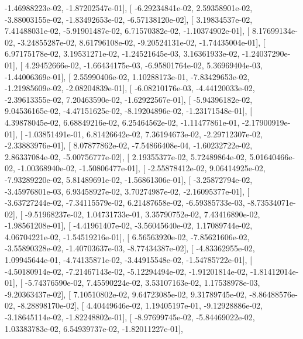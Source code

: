 \documentclass{article}
\begin{document}
         -1.46988223e-02,  -1.87202547e-01],
       [ -6.29234841e-02,   2.59358901e-02,  -3.88003155e-02,
         -1.83492653e-02,  -6.57138120e-02],
       [  3.19834537e-02,   7.41488031e-02,  -5.91901487e-02,
          6.71570382e-02,  -1.10374902e-01],
       [  8.17699134e-02,  -3.24855287e-02,   8.61796108e-02,
         -9.20524131e-02,  -1.74435004e-01],
       [  6.97175178e-02,   3.19531271e-02,  -1.24521645e-03,
          3.16361933e-02,  -1.24037290e-01],
       [  4.29452666e-02,  -1.66434175e-03,  -6.95801764e-02,
          5.36969404e-03,  -1.44006369e-01],
       [  2.55990406e-02,   1.10288173e-01,  -7.83429653e-02,
         -1.21985609e-02,  -2.08204839e-01],
       [ -6.08210176e-03,  -4.44120033e-02,  -2.39613355e-02,
          7.20463590e-02,  -1.62922567e-01],
       [ -5.94396182e-02,   9.04536165e-02,  -4.47151625e-02,
         -8.19204896e-02,  -1.23171548e-01],
       [  4.39878045e-02,   6.68849216e-02,   6.25464562e-02,
         -1.11477861e-01,  -2.17900919e-01],
       [ -1.03851491e-01,   6.81426642e-02,   7.36194673e-02,
         -2.29712307e-02,  -2.33883976e-01],
       [  8.07877862e-02,  -7.54866408e-04,  -1.60232722e-02,
          2.86337084e-02,  -5.00756777e-02],
       [  2.19355377e-02,   5.72489864e-02,   5.01640466e-02,
         -1.00368940e-02,  -1.50806477e-01],
       [ -2.55878412e-02,   9.06414925e-02,  -7.93289220e-02,
          5.81489691e-02,  -1.56861306e-01],
       [ -3.25872794e-02,  -3.45976801e-03,   6.93458927e-02,
          3.70274987e-02,  -2.16095377e-01],
       [ -3.63727244e-02,  -7.34115579e-02,   6.21487658e-02,
         -6.59385733e-03,  -8.73534071e-02],
       [ -9.51968237e-02,   1.04731733e-01,   3.35790752e-02,
          7.43416890e-02,  -1.98561208e-01],
       [ -4.41961407e-02,  -3.56045640e-02,   1.17089744e-02,
          4.06704221e-02,  -1.54519216e-01],
       [  6.56563920e-02,  -7.85621606e-02,  -3.55890328e-02,
         -1.40703637e-03,  -8.77434387e-02],
       [ -4.83362955e-02,   1.09945644e-01,  -4.74135871e-02,
         -3.44915548e-02,  -1.54785722e-01],
       [ -4.50180914e-02,  -7.21467143e-02,  -5.12294494e-02,
         -1.91201814e-02,  -1.81412014e-01],
       [ -5.74376590e-02,   7.45590224e-02,   3.53107163e-02,
          1.17538978e-03,  -9.20363437e-02],
       [  7.10510802e-02,   9.64723085e-02,   9.31789745e-02,
         -8.86488576e-02,  -8.28898170e-02],
       [  4.40449646e-02,   1.19405197e-01,  -9.12928886e-02,
         -3.18645114e-02,  -1.82248802e-01],
       [ -8.97699745e-02,  -5.84469022e-02,   1.03383783e-02,
          6.54939737e-02,  -1.82011227e-01],
\end{document}
